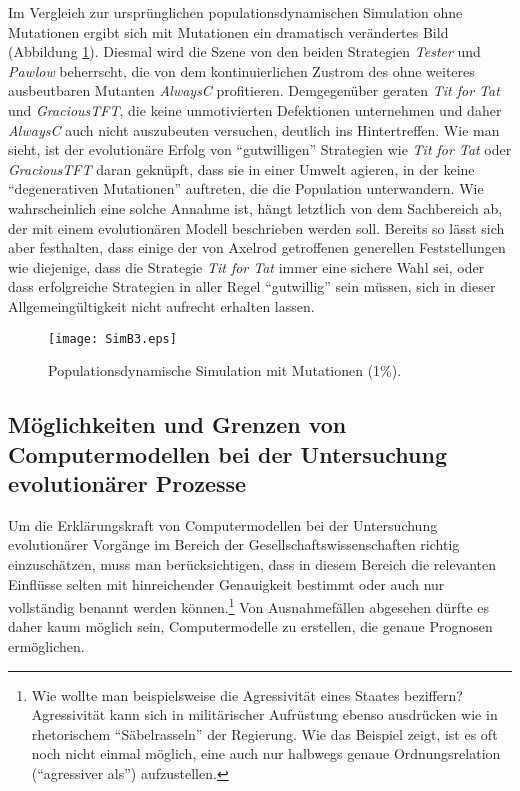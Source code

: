 \documentclass[12pt,a4paper,ngerman]{article}
\begin{document}
Im Vergleich zur ursprünglichen populationsdynamischen Simulation ohne
Mutationen ergibt sich mit Mutationen ein dramatisch verändertes Bild
(Abbildung \ref{SimB3}). Diesmal wird die Szene von den beiden
Strategien {\em Tester} und {\em Pawlow} beherrscht, die von dem
kontinuierlichen Zustrom des ohne weiteres ausbeutbaren Mutanten {\em
  AlwaysC} profitieren. Demgegenüber geraten {\em Tit for Tat} und
{\em GraciousTFT}, die keine unmotivierten Defektionen unternehmen und
daher {\em AlwaysC} auch nicht auszubeuten versuchen, deutlich ins
Hintertreffen. Wie man sieht, ist der evolutionäre Erfolg von
"`gutwilligen"' Strategien wie {\em Tit for Tat} oder {\em
  GraciousTFT} daran geknüpft, dass sie in einer Umwelt agieren, in
der keine "`degenerativen Mutationen"' auftreten, die die Population
unterwandern. Wie wahrscheinlich eine solche Annahme ist, hängt
letztlich von dem Sachbereich ab, der mit einem evolutionären Modell
beschrieben werden soll. Bereits so lässt sich aber festhalten, dass
einige der von Axelrod getroffenen generellen Feststellungen wie
diejenige, dass die Strategie {\em Tit for Tat} immer eine sichere
Wahl sei, oder dass erfolgreiche Strategien in aller Regel
"`gutwillig"' sein müssen, sich in dieser Allgemeingültigkeit nicht
aufrecht erhalten lassen.

\begin{figure}
\begin{center}
\texttt{[image: SimB3.eps]}
\caption{\label{SimB3} {\small Populationsdynamische Simulation mit
Mutationen (1\%).}}
\end{center}
\end{figure}

\subsection{Möglichkeiten und Grenzen von Computermodellen bei der Untersuchung evolutionärer Prozesse}

Um die Erklärungskraft von Computermodellen bei der Untersuchung
evolutionärer Vorgänge im Bereich der Gesellschaftswissenschaften
richtig einzuschätzen, muss man berücksichtigen, dass in diesem
Bereich die relevanten Einflüsse selten mit hinreichender Genauigkeit
bestimmt oder auch nur vollständig benannt werden können.\footnote{Wie
  wollte man beispielsweise die Agressivität eines Staates beziffern?
  Agressivität kann sich in militärischer Aufrüstung ebenso ausdrücken
  wie in rhetorischem "`Säbelrasseln"' der Regierung. Wie das Beispiel
  zeigt, ist es oft noch nicht einmal möglich, eine auch nur halbwegs
  genaue Ordnungsrelation ("`agressiver als"') aufzustellen.} Von
Ausnahmefällen abgesehen dürfte es daher kaum möglich sein,
Computermodelle zu erstellen, die genaue Prognosen ermöglichen.
\end{document}
